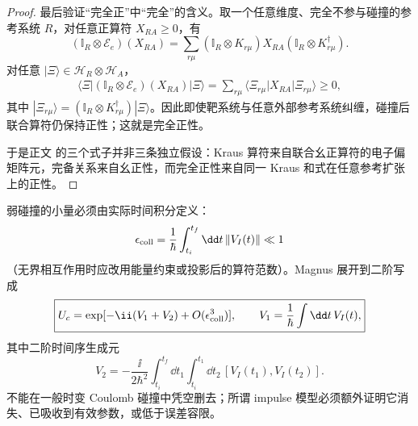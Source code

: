 \begin{proof}
最后验证“完全正”中“完全”的含义。取一个任意维度、完全不参与碰撞的参考系统 $R$，对任意正算符 $X_{RA}\ge0$，有
\begin{equation*}
(\mathbb I_R\otimes\mathscr E_e)(X_{RA})
=\sum_{r\mu}
(\mathbb I_R\otimes K_{r\mu})
X_{RA}
(\mathbb I_R\otimes K_{r\mu}^\dagger).
\end{equation*}
对任意 $|\Xi\rangle\in\mathcal H_R\otimes\mathcal H_A$，
\begin{align*}
\langle\Xi|(\mathbb I_R\otimes\mathscr E_e)(X_{RA})|\Xi\rangle
=\sum_{r\mu}
\langle\Xi_{r\mu}|X_{RA}|\Xi_{r\mu}\rangle\ge0,
\end{align*}
其中 $|\Xi_{r\mu}\rangle=(\mathbb I_R\otimes K_{r\mu}^\dagger)|\Xi\rangle$。因此即使靶系统与任意外部参考系统纠缠，碰撞后联合算符仍保持正性；这就是完全正性。

于是正文 的三个式子并非三条独立假设：Kraus 算符来自联合幺正算符的电子偏矩阵元，完备关系来自幺正性，而完全正性来自同一 Kraus 和式在任意参考扩张上的正性。
\end{proof}


弱碰撞的小量必须由实际时间积分定义：
\begin{equation*}
\epsilon_{\rm coll}
=\frac1\hbar\int_{t_i}^{t_f}\dd t\,\|V_I(t)\|\ll1
\end{equation*}
（无界相互作用时应改用能量约束或投影后的算符范数）。Magnus 展开到二阶写成
\begin{equation}
\boxed{
U_c
=\exp[-\ii(V_1+V_2)+O(\epsilon_{\rm coll}^3)],
\qquad
V_1=\frac1\hbar\int\dd t\,V_I(t),}
\label{eq:general_collision_dyson_magnus_second_order}
\end{equation}
其中二阶时间序生成元
\begin{equation}
\boxed{
V_2
=-\frac{\ii}{2\hbar^2}
\int_{t_i}^{t_f}\dd t_1\int_{t_i}^{t_1}\dd t_2\,
[V_I(t_1),V_I(t_2)].}
\label{eq:general_collision_second_magnus_generator}
\end{equation}
不能在一般时变 Coulomb 碰撞中凭空删去；所谓 impulse 模型必须额外证明它消失、已吸收到有效参数，或低于误差容限。

